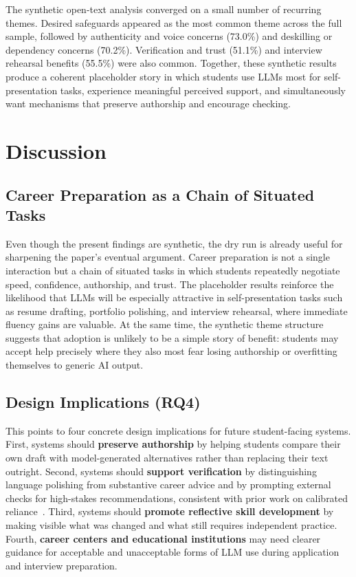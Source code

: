 \documentclass[sigconf,review,anonymous]{acmart}
\begin{document}
The synthetic open-text analysis converged on a small number of recurring themes. Desired safeguards appeared as the most common theme across the full sample, followed by authenticity and voice concerns (73.0\%) and deskilling or dependency concerns (70.2\%). Verification and trust (51.1\%) and interview rehearsal benefits (55.5\%) were also common. Together, these synthetic results produce a coherent placeholder story in which students use LLMs most for self-presentation tasks, experience meaningful perceived support, and simultaneously want mechanisms that preserve authorship and encourage checking.

\section{Discussion}
\label{sec:discussion}

\subsection{Career Preparation as a Chain of Situated Tasks}

Even though the present findings are synthetic, the dry run is already useful for sharpening the paper's eventual argument. Career preparation is not a single interaction but a chain of situated tasks in which students repeatedly negotiate speed, confidence, authorship, and trust. The placeholder results reinforce the likelihood that LLMs will be especially attractive in self-presentation tasks such as resume drafting, portfolio polishing, and interview rehearsal, where immediate fluency gains are valuable. At the same time, the synthetic theme structure suggests that adoption is unlikely to be a simple story of benefit: students may accept help precisely where they also most fear losing authorship or overfitting themselves to generic AI output.

\subsection{Design Implications (RQ4)}

This points to four concrete design implications for future student-facing systems. First, systems should \textbf{preserve authorship} by helping students compare their own draft with model-generated alternatives rather than replacing their text outright. Second, systems should \textbf{support verification} by distinguishing language polishing from substantive career advice and by prompting external checks for high-stakes recommendations, consistent with prior work on calibrated reliance~\cite{schemmer2023appropriatereliance}. Third, systems should \textbf{promote reflective skill development} by making visible what was changed and what still requires independent practice. Fourth, \textbf{career centers and educational institutions} may need clearer guidance for acceptable and unacceptable forms of LLM use during application and interview preparation.
\end{document}
